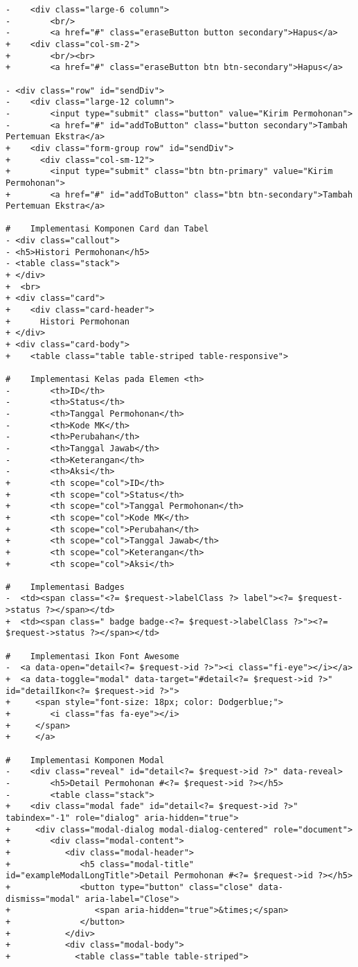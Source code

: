 \begin{lstlisting}
-    <div class="large-6 column">
-        <br/>
-        <a href="#" class="eraseButton button secondary">Hapus</a>
+    <div class="col-sm-2">
+        <br/><br>
+        <a href="#" class="eraseButton btn btn-secondary">Hapus</a>

- <div class="row" id="sendDiv">
-    <div class="large-12 column">
-        <input type="submit" class="button" value="Kirim Permohonan">
-        <a href="#" id="addToButton" class="button secondary">Tambah Pertemuan Ekstra</a>
+    <div class="form-group row" id="sendDiv">
+      <div class="col-sm-12">
+        <input type="submit" class="btn btn-primary" value="Kirim Permohonan">
+        <a href="#" id="addToButton" class="btn btn-secondary">Tambah Pertemuan Ekstra</a>

#    Implementasi Komponen Card dan Tabel
- <div class="callout">
- <h5>Histori Permohonan</h5>
- <table class="stack">
+ </div>
+  <br>
+ <div class="card">
+    <div class="card-header">
+      Histori Permohonan
+ </div>
+ <div class="card-body">
+    <table class="table table-striped table-responsive">

#    Implementasi Kelas pada Elemen <th>
-        <th>ID</th>
-        <th>Status</th>
-        <th>Tanggal Permohonan</th>
-        <th>Kode MK</th>
-        <th>Perubahan</th>
-        <th>Tanggal Jawab</th>
-        <th>Keterangan</th>
-        <th>Aksi</th>
+        <th scope="col">ID</th>
+        <th scope="col">Status</th>
+        <th scope="col">Tanggal Permohonan</th>
+        <th scope="col">Kode MK</th>
+        <th scope="col">Perubahan</th>
+        <th scope="col">Tanggal Jawab</th>
+        <th scope="col">Keterangan</th>
+        <th scope="col">Aksi</th>

#    Implementasi Badges
-  <td><span class="<?= $request->labelClass ?> label"><?= $request->status ?></span></td>
+  <td><span class=" badge badge-<?= $request->labelClass ?>"><?= $request->status ?></span></td>

#    Implementasi Ikon Font Awesome
-  <a data-open="detail<?= $request->id ?>"><i class="fi-eye"></i></a>
+  <a data-toggle="modal" data-target="#detail<?= $request->id ?>" id="detailIkon<?= $request->id ?>">
+     <span style="font-size: 18px; color: Dodgerblue;">
+        <i class="fas fa-eye"></i>
+     </span>
+     </a>

#    Implementasi Komponen Modal
-    <div class="reveal" id="detail<?= $request->id ?>" data-reveal>
-        <h5>Detail Permohonan #<?= $request->id ?></h5>
-        <table class="stack">
+    <div class="modal fade" id="detail<?= $request->id ?>" tabindex="-1" role="dialog" aria-hidden="true">
+     <div class="modal-dialog modal-dialog-centered" role="document">
+        <div class="modal-content">
+           <div class="modal-header">
+              <h5 class="modal-title" id="exampleModalLongTitle">Detail Permohonan #<?= $request->id ?></h5>
+              <button type="button" class="close" data-dismiss="modal" aria-label="Close">
+                 <span aria-hidden="true">&times;</span>
+              </button>
+           </div>
+           <div class="modal-body">
+             <table class="table table-striped">


\end{lstlisting}
